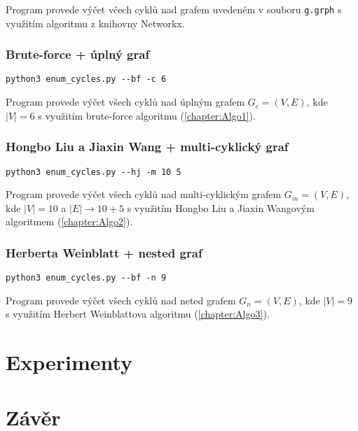            \vspace*{0.5em}
            Program provede výčet včech cyklů nad grafem uvedeném v souboru \texttt{g.grph} s využitím algoritmu z knihovny Networkx.

        \subsection*{Brute-force + úplný graf}
            \texttt{python3 enum\_cycles.py -{}-bf -c 6}

            \vspace*{0.5em}
            Program provede výčet všech cyklů nad úplným grafem $G_c = (V, E)$, kde $|V| = 6$ s využitím brute-force algoritmu (\ref{chapter:Algo1}).

        \subsection*{Hongbo Liu a Jiaxin Wang + multi-cyklický graf}
            \texttt{python3 enum\_cycles.py -{}-hj -m 10 5}

            \vspace*{0.5em}
            Program provede výčet všech cyklů nad multi-cyklickým grafem $G_m = (V, E)$, kde $|V| = 10$ a $|E| \rightarrow 10 + 5$ s využitím Hongbo Liu a Jiaxin Wangovým algoritmem (\ref{chapter:Algo2}).

        \subsection*{Herberta Weinblatt + nested graf}
            \texttt{python3 enum\_cycles.py -{}-bf -n 9}

            \vspace*{0.5em}
            Program provede výčet všech cyklů nad neted grafem $G_n = (V, E)$, kde $|V| = 9$ s využitím Herbert Weinblattova algoritmu (\ref{chapter:Algo3}).


\chapter{Experimenty}
    \label{chapter:Experiments}
    \lipsum

\chapter{Závěr}
    \label{chapter:Conclusion}
    \lipsum[2]
